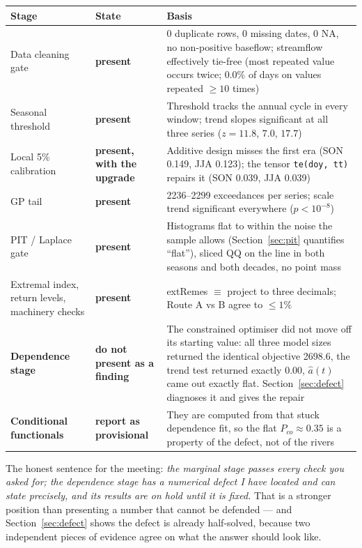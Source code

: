 \documentclass[11pt]{article}
\newcommand{\code}[1]{\texttt{#1}}
\newcommand{\stopsign}[1]{{\color{warn}\textbf{#1}}}
\newcommand{\good}[1]{{\color{ok}\textbf{#1}}}
\begin{document}
\begin{longtable}{@{}p{4.3cm}p{2.1cm}p{8.2cm}@{}}
\toprule
\textbf{Stage} & \textbf{State} & \textbf{Basis} \\
\midrule
\endhead
Data cleaning gate & \good{present} & 0 duplicate rows, 0 missing dates, 0 NA,
no non-positive baseflow; streamflow effectively tie-free (most repeated value
occurs twice; 0.0\% of days on values repeated $\ge 10$ times) \\
Seasonal threshold & \good{present} & Threshold tracks the annual cycle in
every window; trend slopes significant at all three series ($z = 11.8$, $7.0$,
$17.7$) \\
Local 5\% calibration & \good{present, with the upgrade} & Additive design
misses the first era (SON 0.149, JJA 0.123); the tensor
\code{te(doy,\,tt)} repairs it (SON 0.039, JJA 0.039) \\
GP tail & \good{present} & 2236--2299 exceedances per series; scale trend
significant everywhere ($p<10^{-8}$) \\
PIT / Laplace gate & \good{present} & Histograms flat to within the noise the
sample allows (Section~\ref{sec:pit} quantifies ``flat''), sliced QQ on the
line in both seasons and both decades, no point mass \\
Extremal index, return levels, machinery checks & \good{present} & extRemes
$\equiv$ project to three decimals; Route A vs B agree to $\le 1\%$ \\
\midrule
\stopsign{Dependence stage} & \stopsign{do not present as a finding} &
The constrained optimiser did not move off its starting value: all three
model sizes returned the identical objective 2698.6, the trend test returned
exactly 0.00, $\hat a(t)$ came out exactly flat. Section~\ref{sec:defect}
diagnoses it and gives the repair \\
\stopsign{Conditional functionals} & \stopsign{report as provisional} &
They are computed from that stuck dependence fit, so the flat
$P_{co}\approx 0.35$ is a property of the defect, not of the rivers \\
\bottomrule
\end{longtable}

\noindent
The honest sentence for the meeting: \emph{the marginal stage passes every
check you asked for; the dependence stage has a numerical defect I have
located and can state precisely, and its results are on hold until it is
fixed.} That is a stronger position than presenting a number that cannot be
defended --- and Section~\ref{sec:defect} shows the defect is already
half-solved, because two independent pieces of evidence agree on what the
answer should look like.
\end{document}
